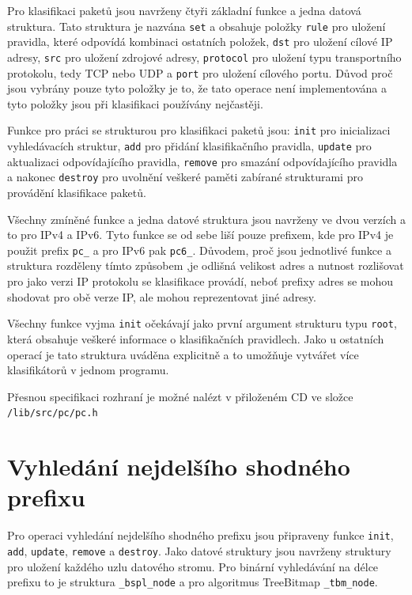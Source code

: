 Pro klasifikaci paketů jsou navrženy čtyři základní funkce a jedna datová struktura.
Tato struktura je nazvána \texttt{set} a obsahuje položky \texttt{rule} pro uložení pravidla,
které odpovídá kombinaci ostatních položek, \texttt{dst} pro uložení cílové IP adresy,
\texttt{src} pro uložení zdrojové adresy, \texttt{protocol} pro uložení typu transportního protokolu,
tedy TCP nebo UDP a \texttt{port} pro uložení cílového portu.
Důvod proč jsou vybrány pouze tyto položky je to, že tato operace není implementována
a tyto položky jsou při klasifikaci používány nejčastěji.

Funkce pro práci se strukturou pro klasifikaci paketů jsou: \texttt{init} pro inicializaci
vyhledávacích struktur, \texttt{add} pro přidání klasifikačního pravidla, \texttt{update}
pro aktualizaci odpovídajícího pravidla, \texttt{remove} pro smazání odpovídajícího pravidla
a nakonec \texttt{destroy} pro uvolnění veškeré paměti zabírané strukturami pro provádění klasifikace
paketů.

Všechny zmíněné funkce a jedna datové struktura jsou navrženy ve dvou verzích a to pro IPv4 a IPv6.
Tyto funkce se od sebe liší pouze prefixem, kde pro IPv4 je použit prefix \texttt{pc\_} a pro
IPv6 pak \texttt{pc6\_}. Důvodem, proč jsou jednotlivé funkce a struktura rozděleny tímto
způsobem ,je odlišná velikost adres a nutnost rozlišovat pro jako verzi IP protokolu se klasifikace provádí,
neboť prefixy adres se mohou shodovat pro obě verze IP, ale mohou reprezentovat jiné adresy.

Všechny funkce vyjma \texttt{init} očekávají jako první argument strukturu typu \texttt{root},
která obsahuje veškeré informace o klasifikačních pravidlech. Jako u ostatních operací
je tato struktura uváděna explicitně a to umožňuje vytvářet více klasifikátorů v jednom programu.

Přesnou specifikaci rozhraní je možné nalézt v přiloženém CD ve složce \texttt{/lib/src/pc/pc.h}

\section{Vyhledání nejdelšího shodného prefixu}\label{api:lpm} %

Pro operaci vyhledání nejdelšího shodného prefixu jsou připraveny funkce
\texttt{init}, \texttt{add}, \texttt{update}, \texttt{remove} a \texttt{destroy}.
Jako datové struktury jsou navrženy struktury pro uložení každého uzlu datového stromu.
Pro binární vyhledávání na délce prefixu to je struktura \texttt{\_bspl\_node} a pro
algoritmus TreeBitmap \texttt{\_tbm\_node}.

